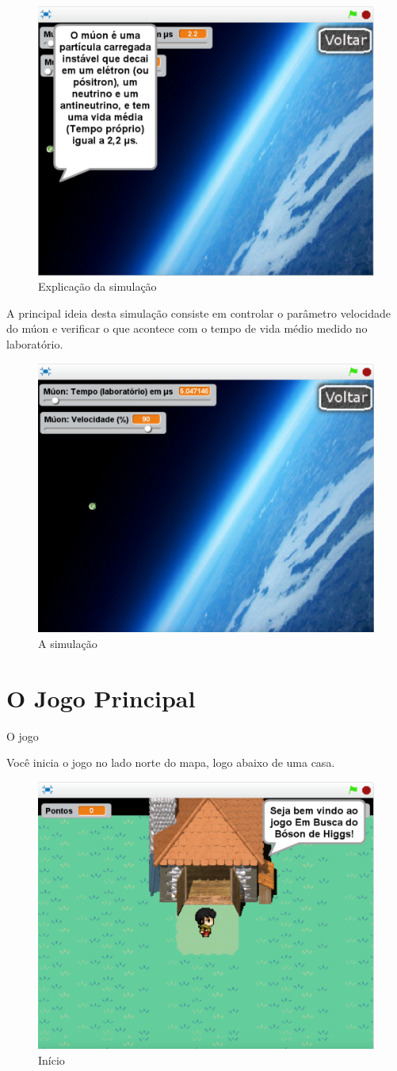 \documentclass[12pt,fleqn]{book} %
\begin{document}
\begin{figure}[h]
	\centering
	\includegraphics[width=0.6 \textwidth]{Produto/sim1}
	\caption{Explicação da simulação}
	\label{fig:app_a:sim1}
\end{figure}

A principal ideia desta simulação consiste em controlar o parâmetro velocidade do múon e verificar o que acontece com o tempo de vida médio medido no laboratório.

\begin{figure}[h]
	\centering
	\includegraphics[width=0.6 \textwidth]{Produto/sim2}
	\caption{A simulação}
	\label{fig:app_a:sim2}
\end{figure}


\section{O Jogo Principal}
O jogo 

Você inicia o jogo no lado norte do mapa, logo abaixo de uma casa. 

\begin{figure}[h]
	\centering
	\includegraphics[width=0.65 \textwidth]{Produto/jogo_1}
	\caption{Início}
	\label{fig:app_a:jogo1}
\end{figure}
\end{document}
